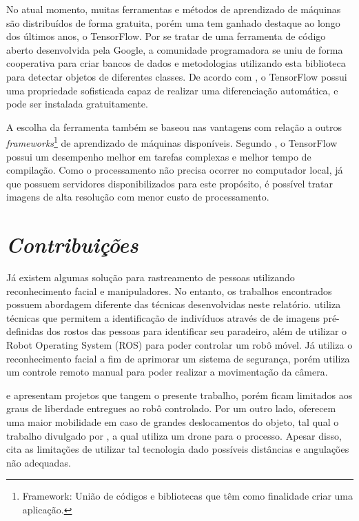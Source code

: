 No atual momento, muitas ferramentas e métodos de aprendizado de máquinas são distribuídos de forma gratuita, porém uma tem ganhado destaque ao longo dos últimos anos, o TensorFlow. Por se tratar de uma ferramenta de código aberto desenvolvida pela Google, a comunidade programadora se uniu de forma cooperativa para criar bancos de dados e metodologias utilizando esta biblioteca para detectar objetos de diferentes classes. De acordo com \cite{shukla18}, o TensorFlow possui uma propriedade sofisticada capaz de realizar uma diferenciação automática, e pode ser instalada gratuitamente.

A escolha da ferramenta também se baseou nas vantagens com relação a outros \textit{frameworks}\footnote{Framework: União de códigos e bibliotecas que têm como finalidade criar uma aplicação.} de aprendizado de máquinas disponíveis. Segundo \cite{lecun15}, o TensorFlow possui um desempenho melhor em tarefas complexas e melhor tempo de compilação. Como o processamento não precisa ocorrer no computador local, já que possuem servidores disponibilizados para este propósito, é possível tratar imagens de alta resolução com menor custo de processamento.


\section{\textit{Contribuições}}\label{sec:Cap2_Contribuicoes}

Já existem algumas solução para rastreamento de pessoas utilizando reconhecimento facial e manipuladores. No entanto, os trabalhos encontrados possuem abordagem diferente das técnicas desenvolvidas neste relatório. \cite{koide2017people} utiliza técnicas que permitem a identificação de indivíduos através de de imagens pré-definidas dos rostos das pessoas para identificar seu paradeiro, além de utilizar o Robot Operating System (ROS) para poder controlar um robô móvel. Já\cite{liu2005ibotguard} utiliza o reconhecimento facial a fim de aprimorar um sistema de segurança, porém utiliza um controle remoto manual para poder realizar a movimentação da câmera.

\cite{suzuki2009human} e \cite{song2004face} apresentam projetos que tangem o presente trabalho, porém ficam limitados aos graus de liberdade entregues ao robô controlado. Por um outro lado, oferecem uma maior mobilidade em caso de grandes deslocamentos do objeto, tal qual o trabalho divulgado por \cite{shanthi2021smart}, a qual utiliza um drone para o processo. Apesar disso, \cite{hsu2015face} cita as limitações de utilizar tal tecnologia dado possíveis distâncias e angulações não adequadas.

